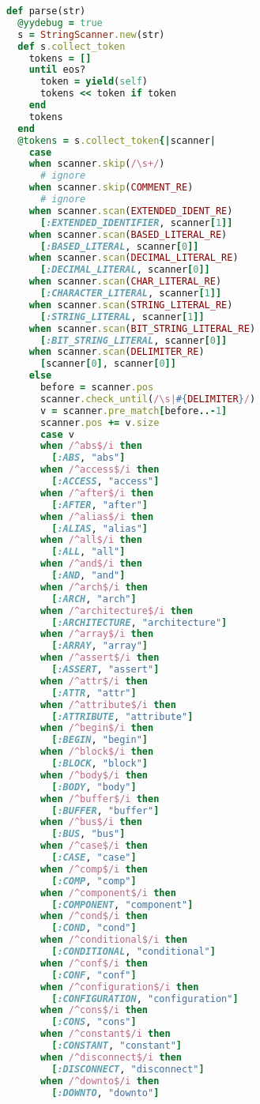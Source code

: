 \begin{lstlisting}[language=Ruby, style=rubystyle]
def parse(str)
  @yydebug = true
  s = StringScanner.new(str)
  def s.collect_token
    tokens = []
    until eos?
      token = yield(self)
      tokens << token if token
    end
    tokens
  end
  @tokens = s.collect_token{|scanner|
    case
    when scanner.skip(/\s+/)
      # ignore
    when scanner.skip(COMMENT_RE)
      # ignore
    when scanner.scan(EXTENDED_IDENT_RE)
      [:EXTENDED_IDENTIFIER, scanner[1]]
    when scanner.scan(BASED_LITERAL_RE)
      [:BASED_LITERAL, scanner[0]]
    when scanner.scan(DECIMAL_LITERAL_RE)
      [:DECIMAL_LITERAL, scanner[0]]
    when scanner.scan(CHAR_LITERAL_RE)
      [:CHARACTER_LITERAL, scanner[1]]
    when scanner.scan(STRING_LITERAL_RE)
      [:STRING_LITERAL, scanner[1]]
    when scanner.scan(BIT_STRING_LITERAL_RE)
      [:BIT_STRING_LITERAL, scanner[0]]
    when scanner.scan(DELIMITER_RE)
      [scanner[0], scanner[0]]
    else
      before = scanner.pos
      scanner.check_until(/\s|#{DELIMITER}/)
      v = scanner.pre_match[before..-1]
      scanner.pos += v.size
      case v
      when /^abs$/i then
        [:ABS, "abs"]
      when /^access$/i then
        [:ACCESS, "access"]
      when /^after$/i then
        [:AFTER, "after"]
      when /^alias$/i then
        [:ALIAS, "alias"]
      when /^all$/i then
        [:ALL, "all"]
      when /^and$/i then
        [:AND, "and"]
      when /^arch$/i then
        [:ARCH, "arch"]
      when /^architecture$/i then
        [:ARCHITECTURE, "architecture"]
      when /^array$/i then
        [:ARRAY, "array"]
      when /^assert$/i then
        [:ASSERT, "assert"]
      when /^attr$/i then
        [:ATTR, "attr"]
      when /^attribute$/i then
        [:ATTRIBUTE, "attribute"]
      when /^begin$/i then
        [:BEGIN, "begin"]
      when /^block$/i then
        [:BLOCK, "block"]
      when /^body$/i then
        [:BODY, "body"]
      when /^buffer$/i then
        [:BUFFER, "buffer"]
      when /^bus$/i then
        [:BUS, "bus"]
      when /^case$/i then
        [:CASE, "case"]
      when /^comp$/i then
        [:COMP, "comp"]
      when /^component$/i then
        [:COMPONENT, "component"]
      when /^cond$/i then
        [:COND, "cond"]
      when /^conditional$/i then
        [:CONDITIONAL, "conditional"]
      when /^conf$/i then
        [:CONF, "conf"]
      when /^configuration$/i then
        [:CONFIGURATION, "configuration"]
      when /^cons$/i then
        [:CONS, "cons"]
      when /^constant$/i then
        [:CONSTANT, "constant"]
      when /^disconnect$/i then
        [:DISCONNECT, "disconnect"]
      when /^downto$/i then
        [:DOWNTO, "downto"]

\end{lstlisting}
